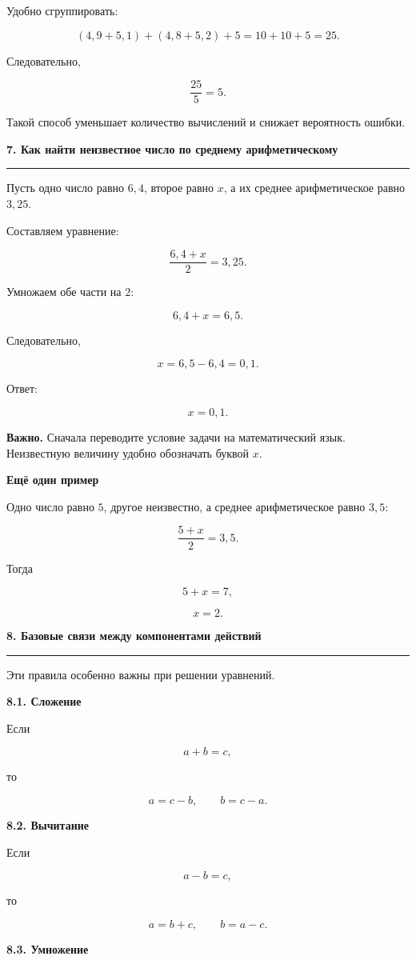 \documentclass[a4paper,12pt]{article}
\newcommand{\topic}[1]{%
  \vspace{0.7em}
  {\Large\bfseries\color{darkaccent}#1}\par
  \vspace{0.25em}
  {\color{accent}\rule{\linewidth}{0.5pt}}
  \vspace{0.55em}
}
\newcommand{\subtopic}[1]{%
  \vspace{0.4em}
  {\large\bfseries\color{darkaccent}#1}\par
  \vspace{0.15em}
}
\newcommand{\important}[1]{%
  \par
  \vspace{0.25em}
  \noindent
  \textcolor{darkaccent}{\textbf{Важно.}} #1
  \par
}
\begin{document}
Удобно сгруппировать:

\[
(4{,}9+5{,}1)+(4{,}8+5{,}2)+5
=
10+10+5
=
25.
\]

Следовательно,

\[
\frac{25}{5}=5.
\]

Такой способ уменьшает количество вычислений и снижает вероятность ошибки.

\topic{7. Как найти неизвестное число по среднему арифметическому}

Пусть одно число равно $6{,}4$, второе равно $x$, а их среднее
арифметическое равно $3{,}25$.

Составляем уравнение:

\[
\frac{6{,}4+x}{2}=3{,}25.
\]

Умножаем обе части на $2$:

\[
6{,}4+x=6{,}5.
\]

Следовательно,

\[
x=6{,}5-6{,}4=0{,}1.
\]

Ответ:

\[
\boxed{x=0{,}1}.
\]

\important{
Сначала переводите условие задачи на математический язык.
Неизвестную величину удобно обозначать буквой $x$.
}

\subtopic{Ещё один пример}

Одно число равно $5$, другое неизвестно, а среднее арифметическое
равно $3{,}5$:

\[
\frac{5+x}{2}=3{,}5.
\]

Тогда

\[
5+x=7,
\]

\[
x=2.
\]

\topic{8. Базовые связи между компонентами действий}

Эти правила особенно важны при решении уравнений.

\subtopic{8.1. Сложение}

Если

\[
a+b=c,
\]

то

\[
a=c-b,
\qquad
b=c-a.
\]

\subtopic{8.2. Вычитание}

Если

\[
a-b=c,
\]

то

\[
a=b+c,
\qquad
b=a-c.
\]

\subtopic{8.3. Умножение}
\end{document}
